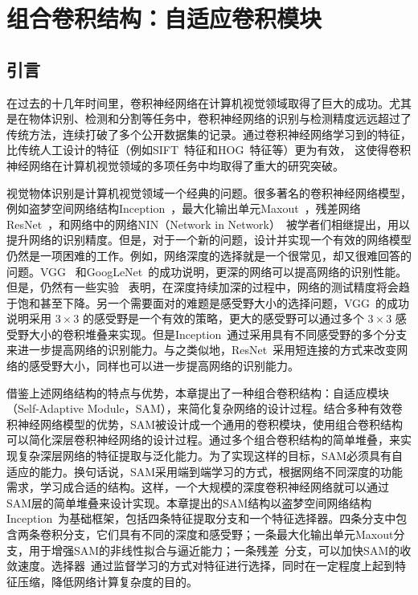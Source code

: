 \chapter{组合卷积结构：自适应卷积模块}
\label{cha:sap}

\section{引言}
\label{sec:sap:introduction}
在过去的十几年时间里，卷积神经网络在计算机视觉领域取得了巨大的成功。尤其是在物体识别、检测和分割等任务中，卷积神经网络的识别与检测精度远远超过了传统方法，连续打破了多个公开数据集的记录。通过卷积神经网络学习到的特征，比传统人工设计的特征（例如SIFT~\cite{lowe1999object, ke2004pca,ke2004pca}特征和HOG~\cite{dalal2005histograms}特征等）更为有效， 这使得卷积神经网络在计算机视觉领域的多项任务中均取得了重大的研究突破。

视觉物体识别是计算机视觉领域一个经典的问题。很多著名的卷积神经网络模型，例如盗梦空间网络结构Inception~\cite{szegedy2014going,szegedy2015rethinking,szegedy2016inception}，最大化输出单元Maxout~\cite{goodfellow2013maxout}，残差网络ResNet~\cite{he2015deep}，和网络中的网络NIN（Network in Network）~\cite{DBLP:journals/corr/LinCY13}被学者们相继提出，用以提升网络的识别精度。但是，对于一个新的问题，设计并实现一个有效的网络模型仍然是一项困难的工作。例如，网络深度的选择就是一个很常见，却又很难回答的问题。VGG~\cite{simonyan2014very} 和GoogLeNet~\cite{szegedy2014going}的成功说明，更深的网络可以提高网络的识别性能。但是，仍然有一些实验~\cite{he2015deep} 表明，在深度持续加深的过程中，网络的测试精度将会趋于饱和甚至下降。另一个需要面对的难题是感受野大小的选择问题，VGG~\cite{simonyan2014very}的成功说明采用 $3\times3$ 的感受野是一个有效的策略，更大的感受野可以通过多个 $3\times3$ 感受野大小的卷积堆叠来实现。但是Inception~\cite{szegedy2014going,szegedy2015rethinking,szegedy2016inception}通过采用具有不同感受野的多个分支来进一步提高网络的识别能力。与之类似地，ResNet~\cite{he2015deep}采用短连接的方式来改变网络的感受野大小，同样也可以进一步提高网络的识别能力。

借鉴上述网络结构的特点与优势，本章提出了一种组合卷积结构：自适应模块（Self-Adaptive Module，SAM），来简化复杂网络的设计过程。结合多种有效卷积神经网络模型的优势，SAM被设计成一个通用的卷积模块，使用组合卷积结构可以简化深层卷积神经网络的设计过程。通过多个组合卷积结构的简单堆叠，来实现复杂深层网络的特征提取与泛化能力。为了实现这样的目标，SAM必须具有自适应的能力。换句话说，SAM采用端到端学习的方式，根据网络不同深度的功能需求，学习成合适的结构。这样，一个大规模的深度卷积神经网络就可以通过SAM层的简单堆叠来设计实现。本章提出的SAM结构以盗梦空间网络结构Inception~\cite{szegedy2014going,szegedy2015rethinking,szegedy2016inception}为基础框架，包括四条特征提取分支和一个特征选择器。四条分支中包含两条卷积分支，它们具有不同的深度和感受野；一条最大化输出单元Maxout\cite{goodfellow2013maxout}分支，用于增强SAM的非线性拟合与逼近能力；一条残差~\cite{he2015deep}分支，可以加快SAM的收敛速度。选择器~\cite{DBLP:journals/corr/LinCY13}通过监督学习的方式对特征进行选择，同时在一定程度上起到特征压缩，降低网络计算复杂度的目的。

